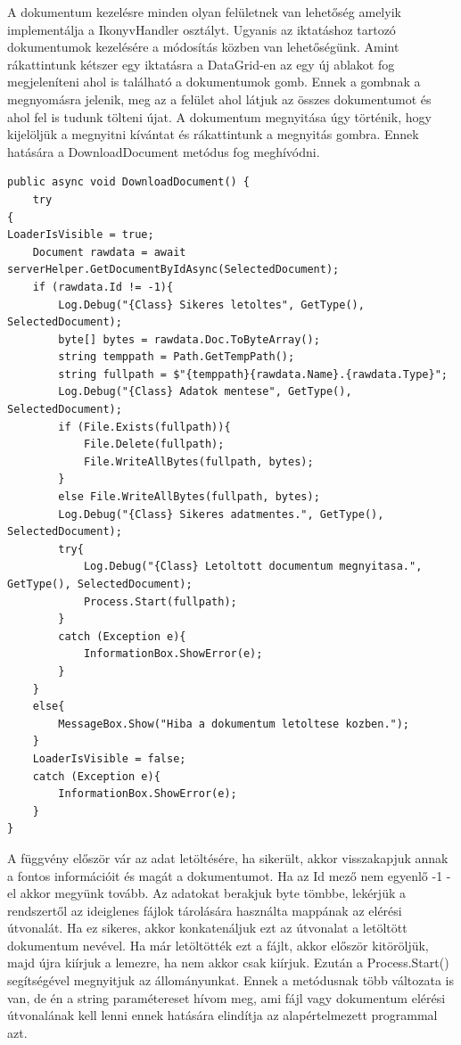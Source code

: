 \documentclass[
]{thesis-ekf}
\theoremstyle{definition}
\theoremstyle{remark}
\begin{document}
A dokumentum kezelésre minden olyan felületnek van lehetőség amelyik implementálja a IkonyvHandler osztályt. Ugyanis az iktatáshoz tartozó dokumentumok kezelésére a módosítás közben van lehetőségünk. Amint rákattintunk kétszer egy iktatásra a DataGrid-en az egy új ablakot fog megjeleníteni ahol is található a dokumentumok gomb. Ennek a gombnak a megnyomásra jelenik, meg az a felület ahol látjuk az összes dokumentumot és ahol fel is tudunk tölteni újat. A dokumentum megnyitása úgy történik, hogy kijelöljük a megnyitni kívántat és rákattintunk a megnyitás gombra. Ennek hatására a DownloadDocument metódus fog meghívódni.
\begin{lstlisting}
public async void DownloadDocument() {
	try
{
LoaderIsVisible = true;
	Document rawdata = await serverHelper.GetDocumentByIdAsync(SelectedDocument);
	if (rawdata.Id != -1){
		Log.Debug("{Class} Sikeres letoltes", GetType(), SelectedDocument);
		byte[] bytes = rawdata.Doc.ToByteArray();
		string temppath = Path.GetTempPath();
		string fullpath = $"{temppath}{rawdata.Name}.{rawdata.Type}";
		Log.Debug("{Class} Adatok mentese", GetType(), SelectedDocument);
		if (File.Exists(fullpath)){
			File.Delete(fullpath);
			File.WriteAllBytes(fullpath, bytes);
		}
		else File.WriteAllBytes(fullpath, bytes);
		Log.Debug("{Class} Sikeres adatmentes.", GetType(), SelectedDocument);
		try{
			Log.Debug("{Class} Letoltott documentum megnyitasa.", GetType(), SelectedDocument);
			Process.Start(fullpath);
		}
		catch (Exception e){
			InformationBox.ShowError(e);
		}
	}
	else{
		MessageBox.Show("Hiba a dokumentum letoltese kozben.");
	}
	LoaderIsVisible = false;
	catch (Exception e){
		InformationBox.ShowError(e);
	}
}
\end{lstlisting}

A függvény először vár az adat letöltésére, ha sikerült, akkor visszakapjuk annak a fontos információit és magát a dokumentumot. Ha az Id mező nem egyenlő -1 -el akkor megyünk tovább. Az adatokat berakjuk byte tömbbe, lekérjük a rendszertől az ideiglenes fájlok tárolására használta mappának az elérési útvonalát. Ha ez sikeres, akkor konkatenáljuk ezt az útvonalat a letöltött dokumentum nevével. Ha már letöltötték ezt a fájlt, akkor először kitöröljük, majd újra kiírjuk a lemezre, ha nem akkor csak kiírjuk. Ezután a Process.Start() segítségével megnyitjuk az állományunkat. Ennek a metódusnak több változata is van, de én a string paramétereset hívom meg, ami fájl vagy dokumentum elérési útvonalának kell lenni ennek hatására elindítja az alapértelmezett programmal azt.
\end{document}
